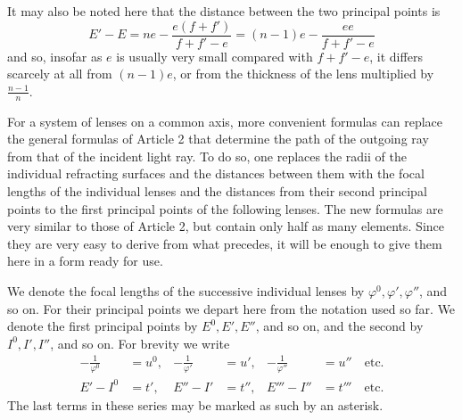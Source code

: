 It may also be noted here that the distance between the two principal points is
\[
E'-E=ne-\frac{e(f+f')}{f+f'-e}=(n-1)e-\frac{ee}{f+f'-e}
\]
and so, insofar as $e$ is usually very small compared with $f+f'-e$, it differs scarcely at all from $(n-1)e$, or from the thickness of the lens multiplied by $\frac{n-1}{n}$.

For a system of lenses on a common axis, more convenient formulas can replace the general formulas of Article 2 that determine the path of the outgoing ray from that of the incident light ray. To do so, one replaces the radii of the individual refracting surfaces and the distances between them with the focal lengths of the individual lenses and the distances from their second principal points to the first principal points of the following lenses. The new formulas are very similar to those of Article 2, but contain only half as many elements. Since they are very easy to derive from what precedes, it will be enough to give them here in a form ready for use.

We denote the focal lengths of the successive individual lenses by $\varphi^0,\varphi',\varphi''$, and so on. For their principal points we depart here from the notation used so far. We denote the first principal points by $E^0,E',E''$, and so on, and the second by $I^0,I',I''$, and so on. For brevity we write
\[
\begin{aligned}
-\frac1{\varphi^0}&=u^0,&-\frac1{\varphi'}&=u',&-\frac1{\varphi''}&=u''\quad\text{etc.}\\
E'-I^0&=t',&E''-I'&=t'',&E'''-I''&=t'''\quad\text{etc.}
\end{aligned}
\]
The last terms in these series may be marked as such by an asterisk.


